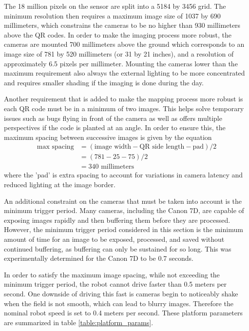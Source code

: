 The 18 million pixels on the sensor are split into a 5184 by 3456 grid.  The minimum resolution then requires a maximum image size of 1037 by 690 millimeters, which constrains the cameras to be no higher than 930 millimeters above the QR codes.  In order to make the imaging process more robust, the cameras are mounted 700 millimeters above the ground which corresponds to an image size of 781 by 520 millimeters (or 31 by 21 inches), and a resolution of approximately 6.5 pixels per millimeter.  Mounting the cameras lower than the maximum requirement also always the external lighting to be more concentrated and requires smaller shading if the imaging is done during the day.  

Another requirement that is added to make the mapping process more robust is each QR code must be in a minimum of two images.  This helps solve temporary issues such as bugs flying in front of the camera as well as offers multiple perspectives if the code is planted at an angle.  In order to ensure this, the maximum spacing between successive images is given by the equation
\begin{align*}
 \text{max spacing} &= (\text{image width} - \text{QR side length} - \text{pad}) / 2 \\
             &= (781 - 25 - 75) / 2 \\ 
             &= 340 \text{ millimeters}
\end{align*}
where the 'pad' is extra spacing to account for variations in camera latency and reduced lighting at the image border.
  
An additional constraint on the cameras that must be taken into account is the minimum trigger period.  Many cameras, including the Canon 7D, are capable of exposing images rapidly and then buffering them before they are processed.  However, the minimum trigger period considered in this section is the minimum amount of time for an image to be exposed, processed, and saved without continued buffering, as buffering can only be sustained for so long.  This was experimentally determined for the Canon 7D to be 0.7 seconds.  

In order to satisfy the maximum image spacing, while not exceeding the minimum trigger period, the robot cannot drive faster than 0.5 meters per second.  One downside of driving this fast is cameras begin to noticeably shake when the field is not smooth, which can lead to blurry images.  Therefore the nominal robot speed is set to 0.4 meters per second.  These platform parameters are summarized in table \ref{table:platform_params}.

